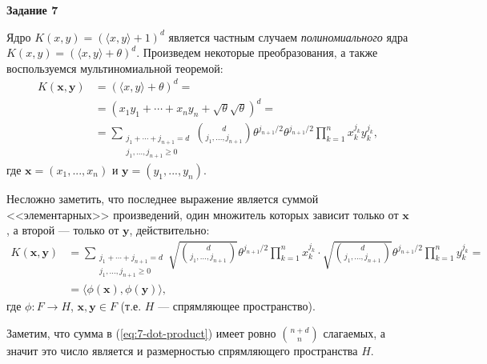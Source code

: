 \documentclass[12pt, a4paper]{extarticle}
\newenvironment*{dummyenv}{}{}
\newcommand{\mysection}[1]{
    \addcontentsline{toc}{section}{#1}
    \begin{dummyenv}
        \bfseries\large #1
    \end{dummyenv}
}
\begin{document}
\mysection{Задание 7}

Ядро $K(x, y) = \left( \langle x, y \rangle + 1 \right) ^ d$ является частным случаем \textit{полиномиального}
ядра $K(x, y) = \left( \langle x, y \rangle + \theta \right) ^ d$. Произведем некоторые преобразования,
а также воспользуемся мультиномиальной теоремой:
\begin{equation}
\begin{split}
    K(\mathbf{x}, \mathbf{y}) & = \left( \langle x, y \rangle + \theta \right) ^ d = \\
    & = \left( x_1 y_1 + \cdots + x_n y_n + \sqrt{\theta} \sqrt{\theta} \right) ^ d = \\
    & = \sum_{\begin{array}{c}j_1 + \cdots + j_{n + 1} = d \\ j_1, ..., j_{n + 1} \geq 0 \end{array}} 
        \binom{d}{j_1, ..., j_{n + 1}} \theta ^ {j_{n+1} / 2} \theta ^ {j_{n+1} / 2} 
        \prod_{k = 1}^{n} x_k ^ {j_k} y_k ^ {j_k},
\end{split}
\end{equation}
где $\mathbf{x} = (x_1, ..., x_n)$ и $\mathbf{y} = (y_1, ..., y_n)$.

Несложно заметить, что последнее выражение является суммой <<элементарных>> произведений, один множитель
которых зависит только от $\mathbf{x}$, а второй --- только от $\mathbf{y}$, действительно:
\begin{equation}
\begin{split}
    K(\mathbf{x}, \mathbf{y}) & = 
        \sum_{\begin{array}{c}j_1 + \cdots + j_{n + 1} = d \\ j_1, ..., j_{n + 1} \geq 0 \end{array}}
        \sqrt{\binom{d}{j_1, ..., j_{n + 1}}} \theta ^ {j_{n+1} / 2} \prod_{k = 1}^{n} x_k ^ {j_k} \cdot
        \sqrt{\binom{d}{j_1, ..., j_{n + 1}}} \theta ^ {j_{n+1} / 2} \prod_{k = 1}^{n} y_k ^ {j_k} = \\
    & = \langle \phi(\mathbf{x}), \phi(\mathbf{y}) \rangle,
\end{split}
\label{eq:7-dot-product}
\end{equation}
где $\phi : F \to H$, $\mathbf{x}, \mathbf{y} \in F$ (т.е. $H$ --- спрямляющее пространство).

Заметим, что сумма в (\ref{eq:7-dot-product}) имеет ровно $\binom{n + d}{n}$ слагаемых, а значит
это число является и размерностью спрямляющего пространства $H$.
\end{document}
